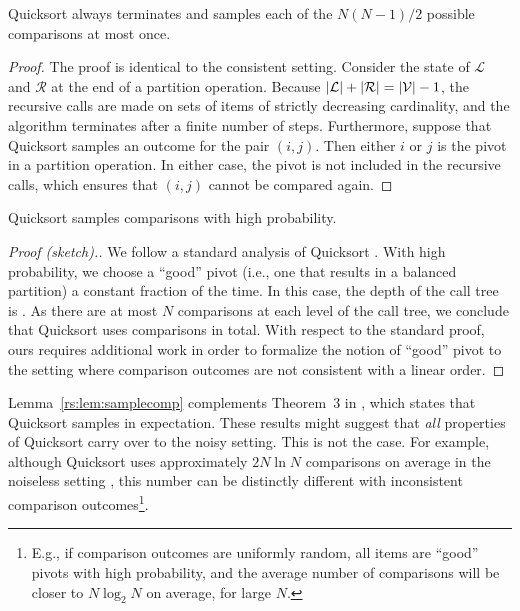 \begin{lemma}
\label{rs:lem:termination}
Quicksort always terminates and samples each of the $N(N\!-\!1) / 2$ possible comparisons at most once.
\end{lemma}

\begin{proof}
The proof is identical to the consistent setting.
Consider the state of $\mathcal{L}$ and $\mathcal{R}$ at the end of a partition operation.
Because $\lvert\mathcal{L}\rvert + \lvert\mathcal{R}\rvert = \lvert\mathcal{V}\rvert - 1$, the recursive calls are made on sets of items of strictly decreasing cardinality, and the algorithm terminates after a finite number of steps.
Furthermore, suppose that Quicksort samples an outcome for the pair $(i, j)$.
Then either $i$ or $j$ is the pivot in a partition operation.
In either case, the pivot is not included in the recursive calls, which ensures that $(i, j)$ cannot be compared again.
\end{proof}

\begin{lemma}
\label{rs:lem:samplecomp}
Quicksort samples  comparisons with high probability.
\end{lemma}

\begin{proof}[Proof (sketch).]
We follow a standard analysis of Quicksort \citep[see, e.g.,][Section 3.3.3]{dubhashi2009concentration}.
With high probability, we choose a ``good'' pivot (i.e., one that results in a balanced partition) a constant fraction of the time.
In this case, the depth of the call tree is .
As there are at most $N$ comparisons at each level of the call tree, we conclude that Quicksort uses  comparisons in total.
With respect to the standard proof, ours requires additional work in order to formalize the notion of ``good'' pivot to the setting where comparison outcomes are not consistent with a linear order.
\end{proof}

Lemma~\ref{rs:lem:samplecomp} complements Theorem~$3$ in \citet{ailon2010preference}, which states that Quicksort samples  in expectation.
These results might suggest that \emph{all} properties of Quicksort carry over to the noisy setting.
This is not the case.
For example, although Quicksort uses approximately $2N \ln N$ comparisons on average in the noiseless setting \citep{sedgewick2011algorithms}, this number can be distinctly different with inconsistent comparison outcomes\footnote{E.g., if comparison outcomes are uniformly random, all items are ``good'' pivots with high probability, and the average number of comparisons will be closer to $N \log_2 N$ on average, for large $N$.}.

